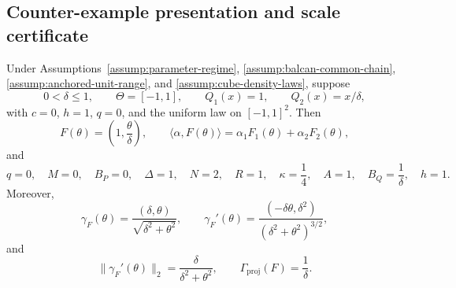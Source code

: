 \subsection{Counter-example presentation and scale certificate}
\label{app:counter-example}

\begin{proposition}
\label{prop:counter-presentation}
Under Assumptions~\ref{assump:parameter-regime},
\ref{assump:balcan-common-chain},
\ref{assump:anchored-unit-range}, and
\ref{assump:cube-density-laws}, suppose
\[
0<\delta\leq1,
\qquad
\Theta=[-1,1],
\qquad
Q_1(x)=1,
\qquad
Q_2(x)=x/\delta,
\]
with $c=0$, $h=1$, $q=0$, and the uniform law on $[-1,1]^2$.  Then
\[
F(\theta)=\left(1,\frac{\theta}{\delta}\right),
\qquad
\langle\alpha,F(\theta)\rangle
=\alpha_1F_1(\theta)+\alpha_2F_2(\theta),
\]
and
\begin{equation}
q=0,
\quad M=0,
\quad B_P=0,
\quad \Delta=1,
\quad N=2,
\quad R=1,
\quad \kappa=\frac14,
\quad A=1,
\quad B_Q=\frac1\delta,
\quad h=1.
\label{eq:appendix-63}
\end{equation}
Moreover,
\begin{equation}
\gamma_F(\theta)
=\frac{(\delta,\theta)}{\sqrt{\delta^2+\theta^2}},
\qquad
\gamma_F'(\theta)
=\frac{(-\delta\theta,\delta^2)}
       {(\delta^2+\theta^2)^{3/2}},
\label{eq:appendix-64}
\end{equation}
and
\begin{equation}
\|\gamma_F'(\theta)\|_2
=\frac{\delta}{\delta^2+\theta^2},
\qquad
\Gamma_{\mathrm{proj}}(F)=\frac1\delta.
\label{eq:appendix-65}
\end{equation}
\end{proposition}

